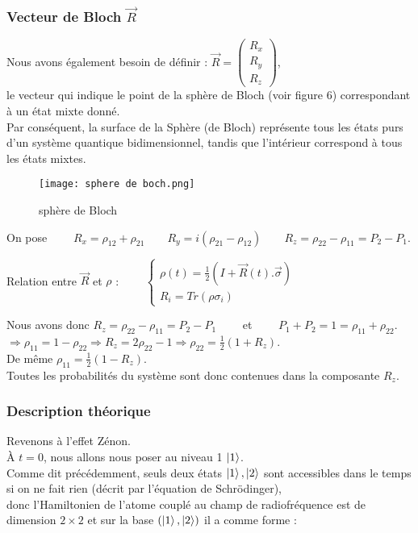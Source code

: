 \documentclass[11pt]{article}
\begin{document}
\subsubsection{Vecteur de Bloch $\Vec{R}$}

Nous avons également besoin de définir : \qquad $\Vec{R} = \begin{pmatrix}
    R_x\\R_y\\R_z
\end{pmatrix}$, \\
le vecteur qui indique le point de la sphère de Bloch (voir figure 6) correspondant à un état mixte donné. \\
Par conséquent, la surface de la Sphère (de Bloch) représente tous les états purs d'un système quantique bidimensionnel, tandis que l'intérieur correspond à tous les états mixtes.

\begin{figure}[h]
 \caption{\label{étiquette} sphère de Bloch~\cite{wikBLC}~\cite{figure}}
 \texttt{[image: sphere de boch.png]}
 \centering
 \end{figure}

\begin{tabbing}
    On pose $\qquad R_x = \rho_{12} + \rho_{21} \qquad R_y = i(\rho_{21} - \rho_{12}) \qquad R_z = \rho_{22} - \rho_{11} = P_2 - P_1$.
\end{tabbing}

Relation entre $\Vec{R}$ et $\rho$ : $\qquad
\begin{cases}
    \rho(t) = \frac{1}{2}(I + \Vec{R}(t).\Vec{\sigma})\\
    R_i = Tr(\rho \sigma_i)
\end{cases}$

\begin{tabbing}
     Nous avons donc $R_z = \rho_{22} - \rho_{11} = P_2 - P_1 \qquad $ et $\qquad P_1 + P_2 = 1 = \rho_{11} + \rho_{22}$.\\
     $\Rightarrow \rho_{11} = 1 - \rho_{22} \Rightarrow R_z = 2\rho_{22} - 1 \Rightarrow \rho_{22} = \frac{1}{2} (1 + R_z)$.\\
     De même  $\rho_{11} = \frac{1}{2} (1 - R_z)$.\\
     Toutes les probabilités du système sont donc contenues dans la composante $R_z$.
\end{tabbing}


\newpage

\subsubsection{Description théorique}
Revenons à l'effet Zénon.\\
À $t=0$, nous allons nous poser au niveau 1 $\ket{1}$.\\
Comme dit précédemment, seuls deux états $\ket{1},\ket{2}$ sont accessibles dans le temps si on ne fait rien (décrit par l'équation de Schrödinger),\\
donc l'Hamiltonien de l'atome couplé au champ de radiofréquence est de dimension $2 \times 2$ et sur la base $(\ket{1},\ket{2})$ il a comme forme :
\end{document}
